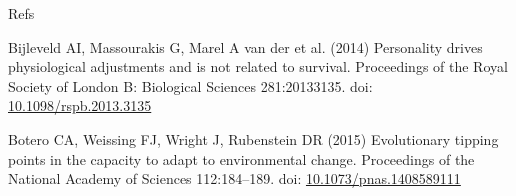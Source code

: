 \documentclass[ignorenonframetext,]{beamer}
\begin{document}
\begin{frame}{Refs}

\hypertarget{refs}{}
\hypertarget{ref-bijleveld_personality_2014}{}
Bijleveld AI, Massourakis G, Marel A van der et al. (2014) Personality
drives physiological adjustments and is not related to survival.
Proceedings of the Royal Society of London B: Biological Sciences
281:20133135. doi:
\href{https://doi.org/10.1098/rspb.2013.3135}{10.1098/rspb.2013.3135}

\hypertarget{ref-botero_evolutionary_2015}{}
Botero CA, Weissing FJ, Wright J, Rubenstein DR (2015) Evolutionary
tipping points in the capacity to adapt to environmental change.
Proceedings of the National Academy of Sciences 112:184--189. doi:
\href{https://doi.org/10.1073/pnas.1408589111}{10.1073/pnas.1408589111}

\end{frame}
\end{document}
